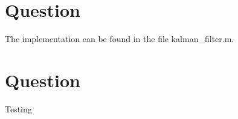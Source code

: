 \documentclass[a4paper, 12pt, titlepage]{article}
\begin{document}
\section{Question}

The implementation can be found in the file kalman_filter.m.

\section{Question}

Testing
\end{document}
